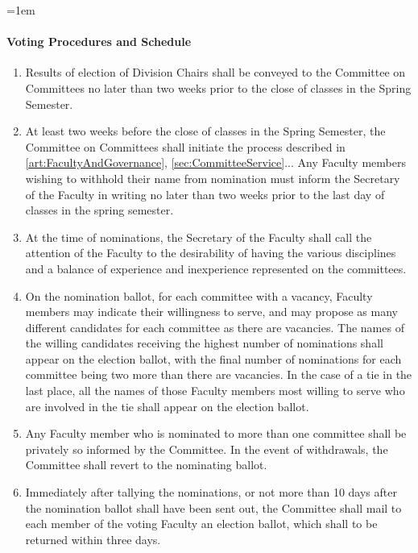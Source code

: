 \documentclass{manual}
\let\oldparagraph\paragraph
\renewcommand\paragraph{\leftskip=1em\oldparagraph}
\newcommand{\itemLevelA}{\alph*.}
\newcommand{\itemRefA}{\alph*}
\begin{document}
\paragraph{Voting Procedures and Schedule} \label{par:VotingProceduresAndSchedule}
\begin{enumerate}[label=\itemLevelA,ref=\itemRefA]

\item Results of election of Division Chairs shall be conveyed to the Committee on Committees no later than two weeks prior to the close of classes in the Spring Semester.

\item At least two weeks before the close of classes in the Spring Semester, the Committee on Committees shall initiate the process described in \cref{art:FacultyAndGovernance}, \cref{sec:CommitteeService}... Any Faculty members wishing to withhold their name from nomination must inform the Secretary of the Faculty in writing no later than two weeks prior to the last day of classes in the spring semester.

\item At the time of nominations, the Secretary of the Faculty shall call the attention of the Faculty to the desirability of having the various disciplines and a balance of experience and inexperience represented on the committees.

\item On the nomination ballot, for each committee with a vacancy,  Faculty members may indicate their willingness to serve, and may propose as many different candidates for each committee as there are vacancies. The names of the willing candidates receiving the highest number of nominations shall appear on the election ballot, with the final number of nominations for each committee being two more than there are vacancies. In the case of a tie in the last place, all the names of those Faculty members most willing to serve who are involved in the tie shall appear on the election ballot.

\item Any Faculty member who is nominated to more than one committee shall be privately so informed by the Committee. In the event of withdrawals, the Committee shall revert to the nominating ballot.

\item Immediately after tallying the nominations, or not more than 10 days after the nomination ballot shall have been sent out, the Committee shall mail to each member of the voting Faculty an election ballot, which shall to be returned within three days.


\end{enumerate}
\end{document}
